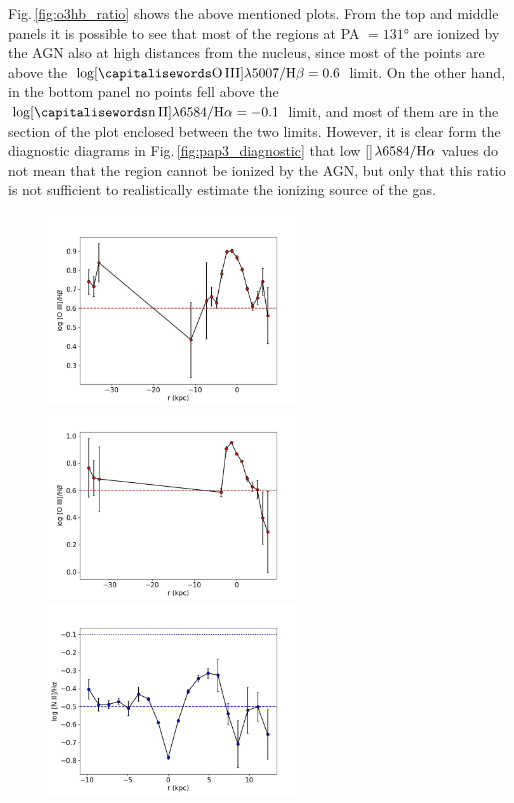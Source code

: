 \documentclass[../main.tex]{subfiles}
\begin{document}
Fig.\,\ref{fig:o3hb_ratio} shows the above mentioned plots.
From the top and middle panels it is possible to see that most of the regions at PA $=\ang{131}$ are ionized by the AGN also at high distances from the nucleus, since most of the points are above the $\log[\rm \ion{O}{III}]\lambda5007/\Hb=0.6$ limit.
On the other hand, in the bottom panel no points fell above the $\log[\rm \ion{n}{II}]\lambda6584/\Ha=-0.1$ limit, and most of them are in the section of the plot enclosed between the two limits.
However, it is clear form the diagnostic diagrams in Fig.\,\ref{fig:pap3_diagnostic} that low []$\lambda6584/\rm H\alpha$ values do not mean that the region cannot be ionized by the AGN, but only that this ratio is not sufficient to realistically estimate the ionizing source of the gas.


\begin{figure}
\centering
\includegraphics[width=0.6\textwidth]{images/paper3/PA131_2016_o3_hb.jpg}\\ 
\includegraphics[width=0.6\textwidth]{images/paper3/PA131_o3_hb.jpg}\\ 
\includegraphics[width=0.6\textwidth]{images/paper3/PA90_n2_ha.jpg}\\ 

\end{figure}
\end{document}
